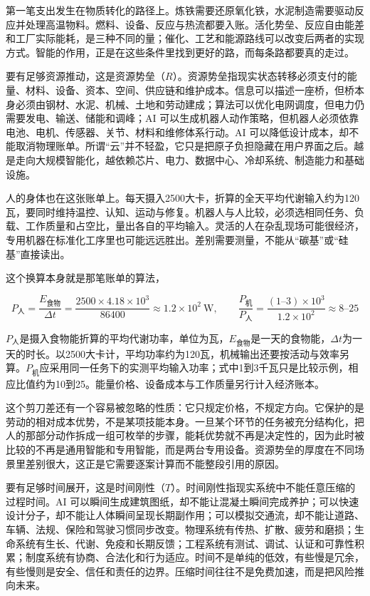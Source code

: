 
第一笔支出发生在物质转化的路径上。炼铁需要还原氧化铁，水泥制造需要驱动反应并处理高温物料。燃料、设备、反应与热流都要入账。活化势垒、反应自由能差和工厂实际能耗，是三种不同的量；催化、工艺和能源路线可以改变后两者的实现方式。智能的作用，正是在这些条件里找到更好的路，而每条路都要真的走过。

要有足够资源推动，这是资源势垒（$R$）。资源势垒指现实状态转移必须支付的能量、材料、设备、资本、空间、供应链和维护成本。信息可以描述一座桥，但桥本身必须由钢材、水泥、机械、土地和劳动建成；算法可以优化电网调度，但电力仍需要发电、输送、储能和调峰；AI 可以生成机器人动作策略，但机器人必须依靠电池、电机、传感器、关节、材料和维修体系行动。AI 可以降低设计成本，却不能取消物理账单。所谓“云”并不轻盈，它只是把原子负担隐藏在用户界面之后。越是走向大规模智能化，越依赖芯片、电力、数据中心、冷却系统、制造能力和基础设施。

人的身体也在这张账单上。每天摄入2500大卡，折算的全天平均代谢输入约为120瓦，要同时维持温控、认知、运动与修复。机器人与人比较，必须选相同任务、负载、工作质量和占空比，量出各自的平均输入。灵活的人在杂乱现场可能很经济，专用机器在标准化工序里也可能远远胜出。差别需要测量，不能从“碳基”或“硅基”直接读出。

这个换算本身就是那笔账单的算法，

\begin{equation}
P_{\text{人}}=\frac{E_{\text{食物}}}{\Delta t}
=\frac{2500\times4.18\times10^{3}}{86400}\approx1.2\times10^{2}\ \text{W},
\qquad
\frac{P_{\text{机}}}{P_{\text{人}}}=\frac{(1\text{--}3)\times10^{3}}{1.2\times10^{2}}\approx8\text{--}25
\end{equation}

$P_{\text{人}}$是摄入食物能折算的平均代谢功率，单位为瓦，$E_{\text{食物}}$是一天的食物能，$\Delta t$为一天的时长。以2500大卡计，平均功率约为120瓦，机械输出还要按活动与效率另算。$P_{\text{机}}$应采用同一任务下的实测平均输入功率；式中1到3千瓦只是比较示例，相应比值约为10到25。能量价格、设备成本与工作质量另行计入经济账本。

这个剪刀差还有一个容易被忽略的性质：它只规定价格，不规定方向。它保护的是劳动的相对成本优势，不是某项技能本身。一旦某个环节的任务被充分结构化，把人的那部分动作拆成一组可枚举的步骤，能耗优势就不再是决定性的，因为此时被比较的不再是通用智能和专用智能，而是两台专用设备。资源势垒的厚度在不同场景里差别很大，这正是它需要逐案计算而不能整段引用的原因。


要有足够时间展开，这是时间刚性（$T$）。时间刚性指现实系统中不能任意压缩的过程时间。AI 可以瞬间生成建筑图纸，却不能让混凝土瞬间完成养护；可以快速设计分子，却不能让人体瞬间呈现长期副作用；可以模拟交通流，却不能让道路、车辆、法规、保险和驾驶习惯同步改变。物理系统有传热、扩散、疲劳和磨损；生命系统有生长、代谢、免疫和长期反馈；工程系统有测试、调试、认证和可靠性积累；制度系统有协商、合法化和行为适应。时间不是单纯的低效，有些慢是冗余，有些慢则是安全、信任和责任的边界。压缩时间往往不是免费加速，而是把风险推向未来。

